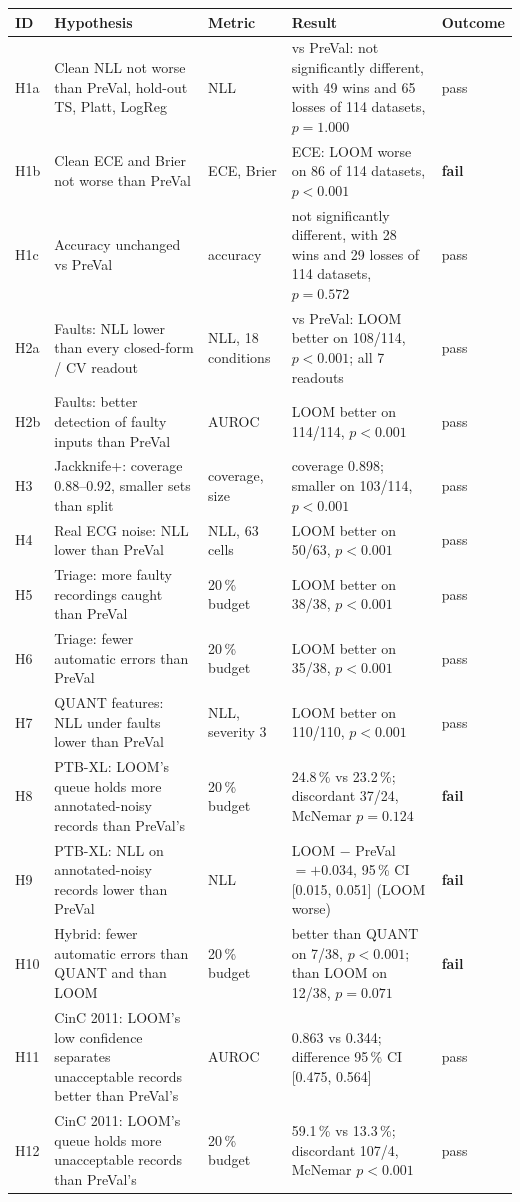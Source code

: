 \begin{tabular}{P{0.75cm}P{4.0cm}P{1.6cm}P{4.6cm}l}
\toprule
ID & Hypothesis & Metric & Result & Outcome \\
\midrule
H1a & Clean NLL not worse than PreVal, hold-out TS, Platt, LogReg & NLL & vs PreVal: not significantly different, with 49 wins and 65 losses of 114 datasets, $p=1.000$ & pass \\
H1b & Clean ECE and Brier not worse than PreVal & ECE, Brier & ECE: LOOM worse on 86 of 114 datasets, $p<0.001$ & \textbf{fail} \\
H1c & Accuracy unchanged vs PreVal & accuracy & not significantly different, with 28 wins and 29 losses of 114 datasets, $p=0.572$ & pass \\
H2a & Faults: NLL lower than every closed-form / CV readout & NLL, 18 conditions & vs PreVal: LOOM better on 108/114, $p<0.001$; all 7 readouts & pass \\
H2b & Faults: better detection of faulty inputs than PreVal & AUROC & LOOM better on 114/114, $p<0.001$ & pass \\
H3 & Jackknife+: coverage 0.88--0.92, smaller sets than split & coverage, size & coverage 0.898; smaller on 103/114, $p<0.001$ & pass \\
H4 & Real ECG noise: NLL lower than PreVal & NLL, 63 cells & LOOM better on 50/63, $p<0.001$ & pass \\
H5 & Triage: more faulty recordings caught than PreVal & 20\,\% budget & LOOM better on 38/38, $p<0.001$ & pass \\
H6 & Triage: fewer automatic errors than PreVal & 20\,\% budget & LOOM better on 35/38, $p<0.001$ & pass \\
H7 & QUANT features: NLL under faults lower than PreVal & NLL, severity 3 & LOOM better on 110/110, $p<0.001$ & pass \\
H8 & PTB-XL: LOOM's queue holds more annotated-noisy records than PreVal's & 20\,\% budget & 24.8\,\% vs 23.2\,\%; discordant 37/24, McNemar $p=0.124$ & \textbf{fail} \\
H9 & PTB-XL: NLL on annotated-noisy records lower than PreVal & NLL & LOOM $-$ PreVal $=+0.034$, 95\,\% CI [0.015, 0.051] (LOOM worse) & \textbf{fail} \\
H10 & Hybrid: fewer automatic errors than QUANT and than LOOM & 20\,\% budget & better than QUANT on 7/38, $p<0.001$; than LOOM on 12/38, $p=0.071$ & \textbf{fail} \\
H11 & CinC 2011: LOOM's low confidence separates unacceptable records better than PreVal's & AUROC & 0.863 vs 0.344; difference 95\,\% CI [0.475, 0.564] & pass \\
H12 & CinC 2011: LOOM's queue holds more unacceptable records than PreVal's & 20\,\% budget & 59.1\,\% vs 13.3\,\%; discordant 107/4, McNemar $p<0.001$ & pass \\
\bottomrule
\end{tabular}
